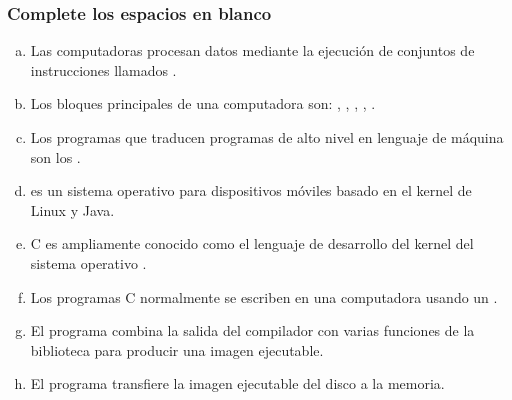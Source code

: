 \subsubsection{Complete los espacios en blanco}
\begin{enumerate}[a)]
  \item Las computadoras procesan datos mediante la ejecución de conjuntos de instrucciones llamados \underspace.
  \item Los bloques principales de una computadora son: \underspace, \underspace, \underspace, \underspace, \underspace.
  \item Los programas que traducen programas de alto nivel en lenguaje de máquina son los \underspace.
  \item \underspace es un sistema operativo para dispositivos móviles basado en el kernel de Linux y Java.
  \item C es ampliamente conocido como el lenguaje de desarrollo del kernel del sistema operativo \underspace.
  \item Los programas C normalmente se escriben en una computadora usando un \underspace.
  \item El programa \underspace combina la salida del compilador con varias funciones de la biblioteca para producir una imagen ejecutable.
  \item El programa \underspace transfiere la imagen ejecutable del disco a la memoria.
  
\end{enumerate}
